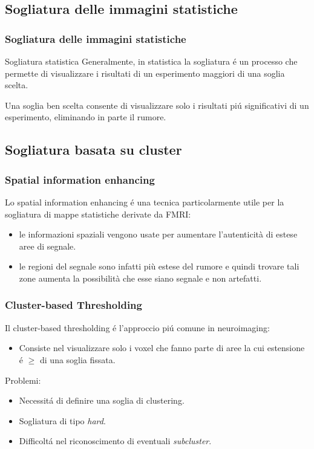 \documentclass{beamer}
\begin{document}
\subsection{Sogliatura delle immagini statistiche}
\begin{frame}
\frametitle{Sogliatura delle immagini statistiche}
\begin{block}{Sogliatura statistica}
Generalmente, in statistica \alert{la sogliatura} \'e un processo che permette di visualizzare i risultati di un esperimento maggiori di una soglia scelta. 
\end{block}

\bigskip

Una soglia ben scelta consente di visualizzare solo i risultati pi\'u significativi di un esperimento, eliminando in parte il rumore.
\end{frame}

\subsection{Sogliatura basata su cluster}
\begin{frame}
\frametitle{Spatial information enhancing}
Lo spatial information enhancing \'e una tecnica particolarmente utile per la sogliatura di mappe statistiche derivate da FMRI:
\smallskip
\begin{itemize}

\item le informazioni spaziali vengono usate per aumentare l'autenticità di estese aree di segnale. 
\medskip
\item le regioni del segnale sono infatti più estese del rumore e quindi trovare tali zone aumenta la possibilità che esse siano segnale e non artefatti.
\end{itemize}

\end{frame}

\begin{frame}
\frametitle{Cluster-based Thresholding}
Il cluster-based thresholding \'e l'approccio pi\'u comune in neuroimaging:
\smallskip
\begin{itemize}
\item Consiste nel visualizzare solo i voxel che fanno parte di aree la cui estensione \'e $\geq$ di una soglia fissata. 
\medskip
\end{itemize}
Problemi:
\begin{itemize}
\item Necessit\'a di definire una soglia di clustering.
\item Sogliatura di tipo \emph{hard}.
\item Difficolt\'a nel riconoscimento di eventuali \emph{subcluster}.
\end{itemize}
\end{frame}
\end{document}
